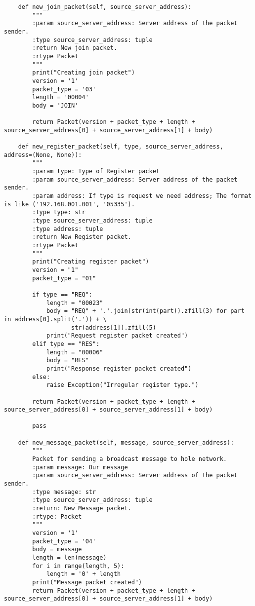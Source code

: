\documentclass{article}
\begin{document}
\begin{lstlisting}
    def new_join_packet(self, source_server_address):
        """
        :param source_server_address: Server address of the packet sender.
        :type source_server_address: tuple
        :return New join packet.
        :rtype Packet
        """
        print("Creating join packet")
        version = '1'
        packet_type = '03'
        length = '00004'
        body = 'JOIN'

        return Packet(version + packet_type + length + source_server_address[0] + source_server_address[1] + body)

    def new_register_packet(self, type, source_server_address, address=(None, None)):
        """
        :param type: Type of Register packet
        :param source_server_address: Server address of the packet sender.
        :param address: If type is request we need address; The format is like ('192.168.001.001', '05335').
        :type type: str
        :type source_server_address: tuple
        :type address: tuple
        :return New Register packet.
        :rtype Packet
        """
        print("Creating register packet")
        version = "1"
        packet_type = "01"

        if type == "REQ":
            length = "00023"
            body = "REQ" + '.'.join(str(int(part)).zfill(3) for part in address[0].split('.')) + \
                   str(address[1]).zfill(5)
            print("Request register packet created")
        elif type == "RES":
            length = "00006"
            body = "RES"
            print("Response register packet created")
        else:
            raise Exception("Irregular register type.")

        return Packet(version + packet_type + length + source_server_address[0] + source_server_address[1] + body)

        pass

    def new_message_packet(self, message, source_server_address):
        """
        Packet for sending a broadcast message to hole network.
        :param message: Our message
        :param source_server_address: Server address of the packet sender.
        :type message: str
        :type source_server_address: tuple
        :return: New Message packet.
        :rtype: Packet
        """
        version = '1'
        packet_type = '04'
        body = message
        length = len(message)
        for i in range(length, 5):
            length = '0' + length
        print("Message packet created")
        return Packet(version + packet_type + length + source_server_address[0] + source_server_address[1] + body)
\end{lstlisting}
\end{document}
